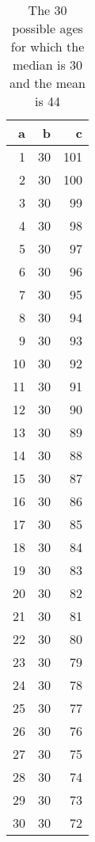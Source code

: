 \begin{center}\begin{table}\begin{tabular}{rrr}
a &  b &  c\\ 
\hline
 1 &  30 &  101\\ 
2 &  30 &  100\\ 
3 &  30 &  99\\ 
4 &  30 &  98\\ 
5 &  30 &  97\\ 
6 &  30 &  96\\ 
7 &  30 &  95\\ 
8 &  30 &  94\\ 
9 &  30 &  93\\ 
10 &  30 &  92\\ 
11 &  30 &  91\\ 
12 &  30 &  90\\ 
13 &  30 &  89\\ 
14 &  30 &  88\\ 
15 &  30 &  87\\ 
16 &  30 &  86\\ 
17 &  30 &  85\\ 
18 &  30 &  84\\ 
19 &  30 &  83\\ 
20 &  30 &  82\\ 
21 &  30 &  81\\ 
22 &  30 &  80\\ 
23 &  30 &  79\\ 
24 &  30 &  78\\ 
25 &  30 &  77\\ 
26 &  30 &  76\\ 
27 &  30 &  75\\ 
28 &  30 &  74\\ 
29 &  30 &  73\\ 
30 &  30 &  72\\ 
\end{tabular}
\caption{The 30 possible ages for which the median is 30 and the mean is 44}\label{medians}\end{table}\end{center}\newcommand\mymedian{30}\newcommand\mymean{44}\newcommand\myconsidered{253460}\newcommand\mycount{30}